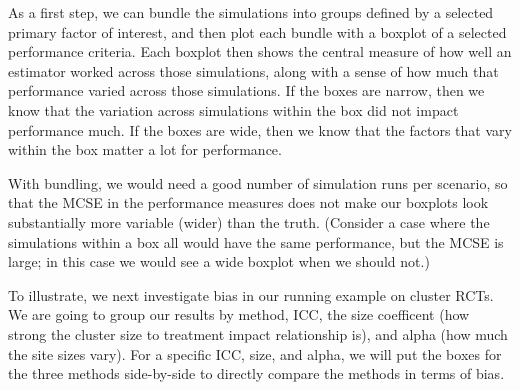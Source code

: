 \documentclass[
]{book}
\newenvironment{Shaded}{\begin{snugshade}}{\end{snugshade}}
\newcommand{\AttributeTok}[1]{\textcolor[rgb]{0.13,0.29,0.53}{#1}}
\newcommand{\ConstantTok}[1]{\textcolor[rgb]{0.56,0.35,0.01}{#1}}
\newcommand{\DecValTok}[1]{\textcolor[rgb]{0.00,0.00,0.81}{#1}}
\newcommand{\FunctionTok}[1]{\textcolor[rgb]{0.13,0.29,0.53}{\textbf{#1}}}
\newcommand{\NormalTok}[1]{#1}
\newcommand{\SpecialCharTok}[1]{\textcolor[rgb]{0.81,0.36,0.00}{\textbf{#1}}}
\begin{document}
As a first step, we can bundle the simulations into groups defined by a selected primary factor of interest, and then plot each bundle with a boxplot of a selected performance criteria.
Each boxplot then shows the central measure of how well an estimator worked across those simulations, along with a sense of how much that performance varied across those simulations.
If the boxes are narrow, then we know that the variation across simulations within the box did not impact performance much.
If the boxes are wide, then we know that the factors that vary within the box matter a lot for performance.

With bundling, we would need a good number of simulation runs per scenario, so that the MCSE in the performance measures does not make our boxplots look substantially more variable (wider) than the truth.
(Consider a case where the simulations within a box all would have the same performance, but the MCSE is large; in this case we would see a wide boxplot when we should not.)

To illustrate, we next investigate bias in our running example on cluster RCTs.
We are going to group our results by method, ICC, the size coefficent (how strong the cluster size to treatment impact relationship is), and alpha (how much the site sizes vary).
For a specific ICC, size, and alpha, we will put the boxes for the three methods side-by-side to directly compare the methods in terms of bias.

\begin{Shaded}
\end{Shaded}
\end{document}
